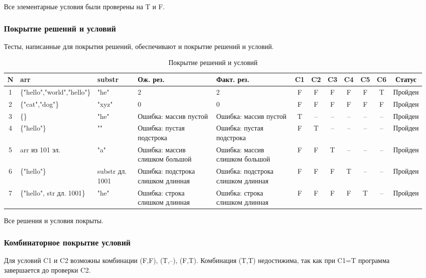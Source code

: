\documentclass{article}[14pt]
\begin{document}
Все элементарные условия были проверены на T и F.

\subsubsection{Покрытие решений и условий}

Тесты, написанные для покрытия решений, обеспечивают и покрытие решений и условий.

\begin{table}[h!]
\centering
\caption{Покрытие решений и условий}
\begin{tabularx}{\textwidth}{|c|X|X|X|X|c|c|c|c|c|c|c|}
\hline
\textbf{N} & \textbf{arr} & \textbf{substr} & \textbf{Ож. рез.} & \textbf{Факт. рез.} & \textbf{C1} & \textbf{C2} & \textbf{C3} & \textbf{C4} & \textbf{C5} & \textbf{C6} & \textbf{Статус} \\
\hline
1 & \{"hello","world","hello"\} & "he" & 2 & 2 & F & F & F & F & F & T & Пройден \\
\hline
2 & \{"cat","dog"\} & "xyz" & 0 & 0 & F & F & F & F & F & F & Пройден \\
\hline
3 & \{\} & "he" & Ошибка: массив пустой & Ошибка: массив пустой & T & -- & -- & -- & -- & -- & Пройден \\
\hline
4 & \{"hello"\} & "" & Ошибка: пустая подстрока & Ошибка: пустая подстрока & F & T & -- & -- & -- & -- & Пройден \\
\hline
5 & arr из 101 эл. & "a" & Ошибка: массив слишком большой & Ошибка: массив слишком большой & F & F & T & -- & -- & -- & Пройден \\
\hline
6 & \{"hello"\} & substr дл. 1001 & Ошибка: подстрока слишком длинная & Ошибка: подстрока слишком длинная & F & F & F & T & -- & -- & Пройден \\
\hline
7 & \{"hello", str дл. 1001\} & "he" & Ошибка: строка слишком длинная & Ошибка: строка слишком длинная & F & F & F & F & T & -- & Пройден \\
\hline
\end{tabularx}
\end{table}

Все решения и условия покрыты.

\subsubsection{Комбинаторное покрытие условий}

Для условий C1 и C2 возможны комбинации (F,F), (T,--), (F,T). Комбинация (T,T) недостижима,
так как при C1=T программа завершается до проверки C2.
\end{document}

